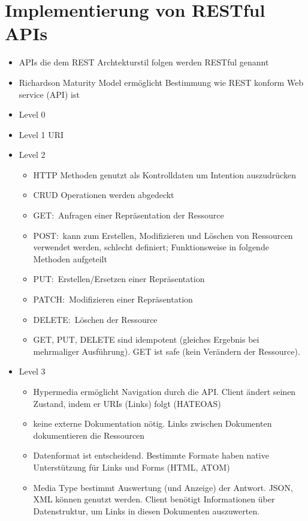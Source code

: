 \section{Implementierung von RESTful APIs}
\begin{itemize}
  \item APIs die dem REST Archtekturstil folgen werden RESTful genannt
  \item Richardson Maturity Model ermöglicht Bestimmung wie REST konform Web service (API) ist
  \item Level 0
  \item Level 1
  URI
  \item Level 2
  \begin{itemize}
    \item HTTP Methoden genutzt als Kontrolldaten um Intention auszudrücken
    \item CRUD Operationen werden abgedeckt
    \item GET:\ Anfragen einer Repräsentation der Ressource
    \item POST:\ kann zum Erstellen, Modifizieren und Löschen von Ressourcen verwendet werden, schlecht definiert; Funktionsweise in folgende Methoden aufgeteilt
    \item PUT:\ Erstellen/Ersetzen einer Repräsentation
    \item PATCH:\ Modifizieren einer Repräsentation
    \item DELETE:\ Löschen der Ressource
    \item GET, PUT, DELETE sind idempotent (gleiches Ergebnis bei mehrmaliger Ausführung). GET ist safe (kein Verändern der Ressource).
  \end{itemize}
  \item Level 3
  \begin{itemize}
    \item Hypermedia ermöglicht Navigation durch die API\@. Client ändert seinen Zustand, indem er URIs (Links) folgt (HATEOAS)
    \item keine externe Dokumentation nötig. Links zwischen Dokumenten dokumentieren die Ressourcen
    \item Datenformat ist entscheidend. Bestimmte Formate haben native Unterstützung für Links und Forms (HTML, ATOM)
    \item Media Type bestimmt Auswertung (und Anzeige) der Antwort. JSON, XML können genutzt werden. Client benötigt Informationen über Datenstruktur, um Links in diesen Dokumenten auszuwerten.
  \end{itemize}
\end{itemize}

